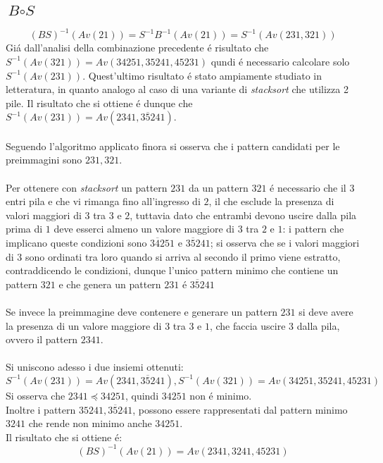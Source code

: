 \subsection*{$\textit{B}\circ\textit{S}$}$$(BS)^{-1}(Av(21))=S^{-1}B^{-1}(Av(21))=S^{-1}(Av(231,321))$$
Gi\'a dall'analisi della combinazione precedente \'e risultato che $S^{-1}(Av(321))=Av(34251, 35241, 45231)$ qundi \'e necessario calcolare solo $S^{-1}(Av(231))$. Quest'ultimo risultato \'e stato ampiamente studiato in letteratura, in quanto analogo al caso di una variante di \textit{stacksort} che utilizza 2 pile. Il risultato che si ottiene \'e dunque che $S^{-1}(Av(231))=Av(2341, 3\overline{5}241)$\cite{claesson2012sorting}.\\\\
Seguendo l'algoritmo applicato finora si osserva che i pattern candidati per le preimmagini sono $231,321$.\\\\
Per ottenere con \textit{stacksort} un pattern $231$ da un pattern $321$ \'e necessario che il $3$ entri pila e che vi rimanga fino all'ingresso di $2$, il che esclude la presenza di valori maggiori di $3$ tra $3$ e $2$, tuttavia dato che entrambi devono uscire dalla pila prima di $1$ deve esserci almeno un valore maggiore di $3$ tra $2$ e $1$: i pattern che implicano queste condizioni sono $3\overline{4}251$ e $3\overline{5}241$; si osserva che se i valori maggiori di $3$ sono ordinati tra loro quando si arriva al secondo il primo viene estratto, contraddicendo le condizioni, dunque l'unico pattern minimo che contiene un pattern $321$ e che genera un pattern $231$ \'e $3\overline{5}241$ \\
\\Se invece la preimmagine deve contenere e generare un pattern $231$ si deve avere la presenza di un valore maggiore di $3$ tra $3$ e $1$, che faccia uscire $3$ dalla pila, ovvero il pattern $2341$.\\\\
Si uniscono adesso i due insiemi ottenuti:
$$S^{-1}(Av(231))=Av(2341,3\overline{5}241), S^{-1}(Av(321))=Av(34251, 35241, 45231)$$
Si osserva che $2341\preceq 34251$, quindi $34251$ non \'e minimo.\\
Inoltre i pattern $35241, 3\overline{5}241$, possono essere rappresentati dal pattern minimo $3241$ che rende non minimo anche $34251$.\\Il risultato che si ottiene \'e:$$(BS)^{-1}(Av(21))=Av(2341,3241,45231)$$